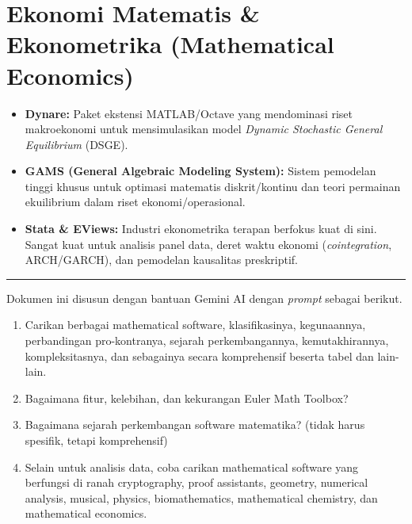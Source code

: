 \documentclass[11pt, a4paper, numbers=enddot, oneside]{scrbook}
\begin{document}
\section{Ekonomi Matematis \& Ekonometrika (Mathematical Economics)}

\begin{itemize}
    \item \textbf{Dynare:} Paket ekstensi MATLAB/Octave yang mendominasi riset makroekonomi untuk mensimulasikan model \emph{Dynamic Stochastic General Equilibrium} (DSGE).
    \item \textbf{GAMS (General Algebraic Modeling System):} Sistem pemodelan tinggi khusus untuk optimasi matematis diskrit/kontinu dan teori permainan ekuilibrium dalam riset ekonomi/operasional.
    \item \textbf{Stata \& EViews:} Industri ekonometrika terapan berfokus kuat di sini. Sangat kuat untuk analisis panel data, deret waktu ekonomi (\emph{cointegration}, ARCH/GARCH), dan pemodelan kausalitas preskriptif.
\end{itemize}

\bigskip
\noindent\rule{\textwidth}{0.4pt}
\medskip

\noindent Dokumen ini disusun dengan bantuan Gemini AI dengan \emph{prompt} sebagai berikut.

\begin{enumerate}
    \item Carikan berbagai mathematical software, klasifikasinya, kegunaannya, perbandingan pro-kontranya, sejarah perkembangannya, kemutakhirannya, kompleksitasnya, dan sebagainya secara komprehensif beserta tabel dan lain-lain.
    \item Bagaimana fitur, kelebihan, dan kekurangan Euler Math Toolbox?
    \item Bagaimana sejarah perkembangan software matematika? (tidak harus spesifik, tetapi komprehensif)
    \item Selain untuk analisis data, coba carikan mathematical software yang berfungsi di ranah cryptography, proof assistants, geometry, numerical analysis, musical, physics, biomathematics, mathematical chemistry, dan mathematical economics.
\end{enumerate}
\end{document}
